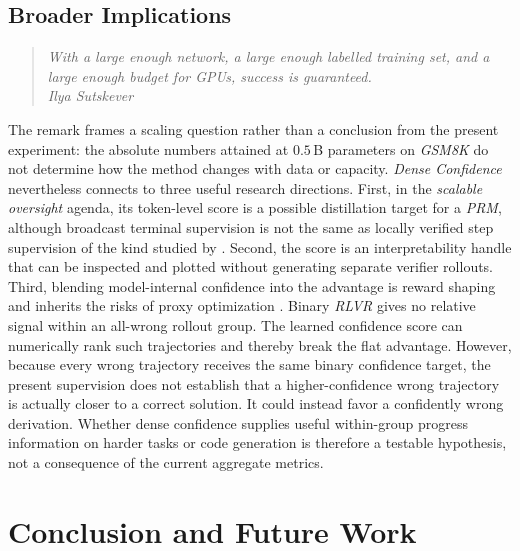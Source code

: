 \documentclass[a4paper,oneside,10pt,english]{scrbook}
\DeclareRobustCommand{\acfit}[1]{\textit{\ac{#1}}}
\begin{document}
\section{Broader Implications}
\label{sec:disc:broader}

\begin{quote}
	\itshape With a large enough network, a large enough labelled training set, and a large enough budget for GPUs, success is guaranteed.\\
	\hspace*{1em}Ilya Sutskever
\end{quote}
\noindent The remark frames a scaling question rather than a conclusion from the present experiment: the absolute numbers attained at $0.5\,$B parameters on \acfit{GSM8K} do not determine how the method changes with data or capacity. \textit{Dense Confidence} nevertheless connects to three useful research directions. First, in the \emph{scalable oversight} agenda, its token-level score is a possible distillation target for a \acfit{PRM}, although broadcast terminal supervision is not the same as locally verified step supervision of the kind studied by \citet{verifystepbystep}. Second, the score is an interpretability handle that can be inspected and plotted without generating separate verifier rollouts. Third, blending model-internal confidence into the advantage is reward shaping and inherits the risks of proxy optimization \citep{rewardoveropt,spuriousrewards}. Binary \acfit{RLVR} gives no relative signal within an all-wrong rollout group. The learned confidence score can numerically rank such trajectories and thereby break the flat advantage. However, because every wrong trajectory receives the same binary confidence target, the present supervision does not establish that a higher-confidence wrong trajectory is actually closer to a correct solution. It could instead favor a confidently wrong derivation. Whether dense confidence supplies useful within-group progress information on harder tasks or code generation \citep{evalllmscode} is therefore a testable hypothesis, not a consequence of the current aggregate metrics.

\cleardoubleoddpage
\chapter{Conclusion and Future Work}
\label{ch:conclusion}
\end{document}
